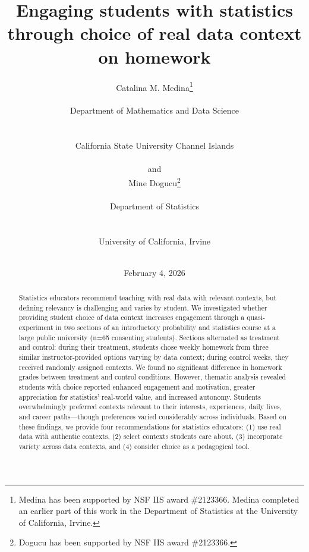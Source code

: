 \documentclass[
  12pt]{article}
\begin{document}
\def\spacingset#1{\renewcommand{\baselinestretch}%
{#1}\small\normalsize} \spacingset{1}



\date{February 4, 2026}
\title{\bf Engaging students with statistics through choice of real data
context on homework}
\author{
Catalina M. Medina\thanks{Medina has been supported by NSF IIS award
\#2123366. Medina completed an earlier part of this work in the
Department of Statistics at the University of California, Irvine.}\\
\parbox[t]{0.9\textwidth}{\centering Department of Mathematics and Data
Science}\\
\parbox[t]{0.9\textwidth}{\centering California State University Channel
Islands}\\[0.5em]
and\\[0.5em]
Mine Dogucu\thanks{Dogucu has been supported by NSF IIS award
\#2123366.}\\
\parbox[t]{0.9\textwidth}{\centering Department of Statistics}\\
\parbox[t]{0.9\textwidth}{\centering University of California,
Irvine}\\[0.5em]
}
\maketitle

\bigskip
\bigskip
\begin{abstract}
Statistics educators recommend teaching with real data with relevant
contexts, but defining relevancy is challenging and varies by student.
We investigated whether providing student choice of data context
increases engagement through a quasi-experiment in two sections of an
introductory probability and statistics course at a large public
university (n=65 consenting students). Sections alternated as treatment
and control: during their treatment, students chose weekly homework from
three similar instructor-provided options varying by data context;
during control weeks, they received randomly assigned contexts. We found
no significant difference in homework grades between treatment and
control conditions. However, thematic analysis revealed students with
choice reported enhanced engagement and motivation, greater appreciation
for statistics' real-world value, and increased autonomy. Students
overwhelmingly preferred contexts relevant to their interests,
experiences, daily lives, and career paths---though preferences varied
considerably across individuals. Based on these findings, we provide
four recommendations for statistics educators: (1) use real data with
authentic contexts, (2) select contexts students care about, (3)
incorporate variety across data contexts, and (4) consider choice as a
pedagogical tool.
\end{abstract}
\end{document}
